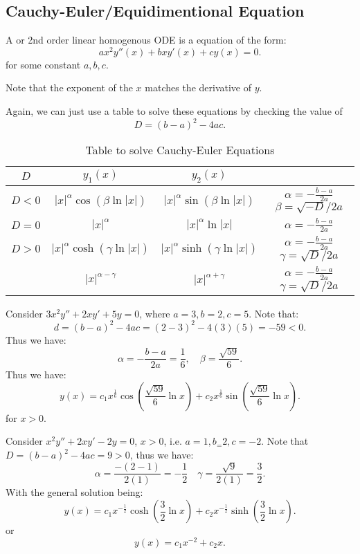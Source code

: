 \documentclass[../main/main.tex]{subfiles}
\begin{document}
\subsection{Cauchy-Euler/Equidimentional Equation}
\begin{definition} 
	A  or  2nd order linear homogenous ODE is a equation of the form: \[
		ax^2y''(x)+bxy'(x)+cy(x)=0
	.\] for some constant $a,b,c$.
\end{definition}
\begin{remark}
	Note that the exponent of the $x$ matches the derivative of $y$.
\end{remark}
Again, we can just use a table to solve these equations by checking the value of  \[
	D=(b-a)^2-4ac
.\]  
\begin{table}[htpb]
	\centering
	\caption{Table to solve Cauchy-Euler Equations}
	\label{tab:label}
	\begin{tabular}{c|c|c|c}
		$D$&$y_1(x)$  &$y_2(x)$  & \\
		\hline
		$D<0$ & $|x|^{\alpha}\cos(\beta\ln|x|)$  & $|x|^{\alpha}\sin(\beta\ln|x|)$  & $\alpha=-\frac{b-a}{2a}$ $\beta=\sqrt{-D} /2a$\\
		\hline
		$D=0$ & $|x|^{\alpha}$  & $|x|^{\alpha}\ln|x|$  & $\alpha=-\frac{b-a}{2a}$\\
		\hline
		$D>0$ & $|x|^{\alpha}\cosh(\gamma\ln|x|)$  & $|x|^{\alpha}\sinh(\gamma\ln|x|)$  & $\alpha=-\frac{b-a}{2a}$ $\gamma=\sqrt{D} /2a$\\
		 & $|x|^{\alpha-\gamma}$  & $|x|^{\alpha+\gamma}$  & $\alpha=-\frac{b-a}{2a}$ $\gamma=\sqrt{D} /2a$\\
	\end{tabular}
\end{table}
\begin{example}
	Consider $3x^2y''+2xy'+5y=0$, where $a=3,b=2,c=5$. Note that:  \[
		d=(b-a)^2-4ac=(2-3)^2-4(3)(5)=-59<0
	.\] Thus we have: \[
	\alpha=-\frac{b-a}{2a}=\frac{1}{6},\quad\beta=\frac{\sqrt{59}	}{6}
	.\] Thus we have: \[
	y(x) = c_1x^{\frac{1}{6}}\cos(\frac{\sqrt{59}}{6}\ln x)+c_2x^{\frac{1}{6}}\sin(\frac{\sqrt{59} }{6}\ln x)
	.\] for $x>0$.
\end{example}

\begin{example}
	Consider $x^2y''+2xy'-2y=0$, $x>0$, i.e. $a=1,b_=2,c=-2$. Note that $D=(b-a)^2-4ac=9>0$, thus we have: \[
		\alpha= \frac{-(2-1)}{2(1)}=-\frac{1}{2}\quad \gamma= \frac{\sqrt{9} }{2(1)}=\frac{3}{2}
	.\] With the general solution being: 
	\[
		y(x) =c_1x^{-\frac{1}{2}}\cosh(\frac{3}{2}\ln x)+c_2x^{-\frac{1}{2}}\sinh(\frac{3}{2}\ln x)
	.\] or \[
	y(x) = c_1 x^{-2}+c_2 x
	.\] 
\end{example}
\end{document}
